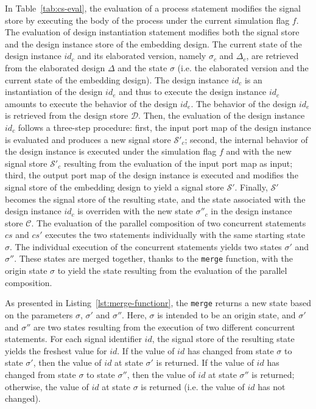 In Table~\ref{tab:cs-eval}, the evaluation of a process statement
modifies the signal store by executing the body of the process under
the current simulation flag $f$. The evaluation of design
instantiation statement modifies both the signal store and the design
instance store of the embedding design. The current state of the
design instance $id_c$ and its elaborated version, namely $\sigma_c$
and $\Delta_c$, are retrieved from the elaborated design $\Delta$ and
the state $\sigma$ (i.e. the elaborated version and the current state
of the embedding design). The design instance $id_c$ is an
instantiation of the design $id_e$ and thus to execute the design
instance $id_c$ amounts to execute the behavior of the design
$id_e$. The behavior of the design $id_e$ is retrieved from the design
store $\mathcal{D}$. Then, the evaluation of the design instance
$id_c$ follows a three-step procedure: first, the input port map of
the design instance is evaluated and produces a new signal store
$\mathcal{S}'_c$; second, the internal behavior of the design instance
is executed under the simulation flag $f$ and with the new signal
store $\mathcal{S}'_c$ resulting from the evaluation of the input port
map as input; third, the output port map of the design instance is
executed and modifies the signal store of the embedding design to
yield a signal store $\mathcal{S}'$. Finally, $\mathcal{S}'$ becomes
the signal store of the resulting state, and the state associated with
the design instance $id_c$ is overriden with the new state
$\sigma''_c$ in the design instance store $\mathcal{C}$.  The
evaluation of the parallel composition of two concurrent statements
$cs$ and $cs'$ executes the two statements individually with the same
starting state $\sigma$. The individual execution of the concurrent
statements yields two states $\sigma'$ and $\sigma''$. These states
are merged together, thanks to the \texttt{merge} function, with the
origin state $\sigma$ to yield the state resulting from the evaluation
of the parallel composition.

As presented in Listing~\ref{lst:merge-functionr}, the \texttt{merge}
returns a new state based on the parameters $\sigma$, $\sigma'$ and
$\sigma''$. Here, $\sigma$ is intended to be an origin state, and
$\sigma'$ and $\sigma''$ are two states resulting from the execution
of two different concurrent statements. For each signal identifier
$id$, the signal store of the resulting state yields the freshest
value for $id$. If the value of $id$ has changed from state $\sigma$
to state $\sigma'$, then the value of $id$ at state $\sigma'$ is
returned. If the value of $id$ has changed from state $\sigma$ to
state $\sigma''$, then the value of $id$ at state $\sigma''$ is
returned; otherwise, the value of $id$ at state $\sigma$ is returned
(i.e. the value of $id$ has not changed). 

